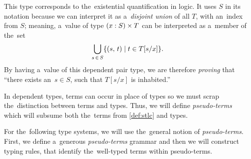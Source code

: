 This type corresponds to the~existential quantification in logic. It uses $S$ in
its notation because we can interpret it as a~\emph{disjoint union} of all $T$,
with an~index from $S$; meaning, a~value of type $(x \overset{}: S) \times T$ can be
interpreted as a~member of the~set
\[
  \bigcup_{s \, \in \, S} \{ (s, \, t) \mid t \in T[s/x] \}.
\]
By having a~value of this dependent pair type, we are therefore \emph{proving}
that ``there exists an~$s \in S$, such that $T[s/x]$ is inhabited.''

In dependent types, terms can occur in place of types so we must scrap
the~distinction between terms and types. Thus, we will define
\emph{pseudo-terms} which will subsume both the~terms from \autoref{def:stlc}
and types.


For the~following type systems, we will use the~general notion of
\emph{pseudo-terms}. First, we define a~generous \emph{pseudo-terms} grammar and
then we will construct typing rules, that identify the~well-typed terms within
pseudo-terms.


